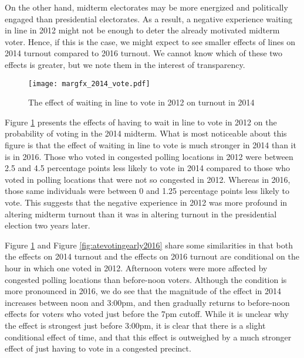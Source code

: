 \documentclass[12pt,titlepage]{article}
\begin{document}
On the other hand, midterm electorates may be more energized and politically
engaged than presidential electorates.  As a result, a negative experience waiting in line in 2012 might
not be enough to deter the already motivated midterm voter.  Hence, if this is the case,  we might expect to see smaller
effects of lines on 2014 turnout compared to 2016 turnout.  We cannot know which of these two effects
is greater, but we note them in the interest of transparency.



\begin{figure}[!ht]
  \caption{The effect of waiting in line to vote in 2012 on turnout in 2014}
  \centering\texttt{[image: margfx\_2014\_vote.pdf]}
  \label{fig:prvoting2014}
\end{figure}

Figure \ref{fig:prvoting2014} presents the effects of having to wait in line to 
vote in 2012 on the probability of voting in the 2014 midterm.  What is most
noticeable about this figure is that the effect of waiting in line to vote is much stronger in
2014 than it is in 2016.  Those who voted in
congested polling locations in 2012 were between 2.5 and 4.5 percentage points less likely to
vote in 2014 compared to those who voted in polling locations that were not so congested in 2012. 
Whereas in 2016, those same individuals were between 0 and 1.25 percentage points less likely
to vote.  This suggests that the negative experience in 2012 was more profound in altering midterm
turnout than it was in altering turnout in the presidential election two years later.

Figure \ref{fig:prvoting2014} and Figure \ref{fig:atevotingearly2016} share some similarities in that both
 the effects on 2014 turnout and the effects on 2016 turnout are conditional on the
hour in which one voted in 2012.  Afternoon voters were more affected by congested polling locations
than before-noon voters.  Although the condition is more pronounced in 2016,  we do see that the magnitude
of the effect in 2014 increases between noon and 3:00pm, and then gradually returns to before-noon effects
for voters who voted just before the 7pm cutoff.  While it is unclear why the effect is strongest just before 3:00pm, 
it is clear that there is a slight conditional effect of time, and that this effect is outweighed by a much stronger effect of
just having to vote in a congested precinct. 
\end{document}
